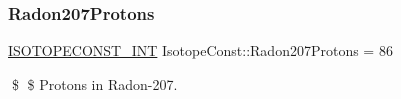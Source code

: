 \subsubsection{\texorpdfstring{Radon207\+Protons}{Radon207Protons}}
{\footnotesize\ttfamily \mbox{\hyperlink{group___isotope_const-_macros_ga5f18360b3e99483a35c32d789e62621c}{I\+S\+O\+T\+O\+P\+E\+C\+O\+N\+S\+T\+\_\+\+I\+NT}} Isotope\+Const\+::\+Radon207\+Protons = 86}

\$ \$ Protons in Radon-\/207. 